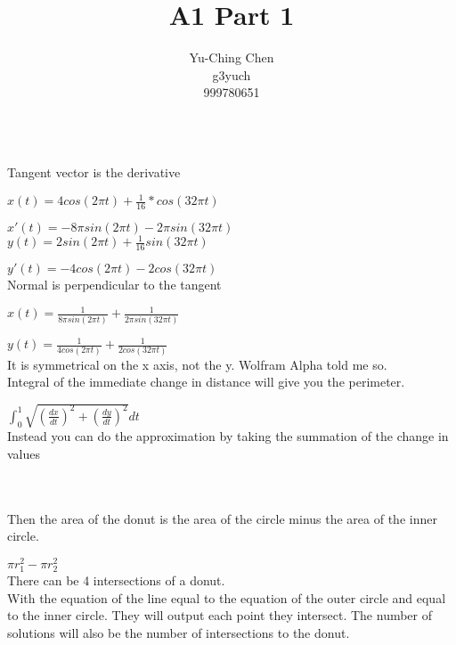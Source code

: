 \documentclass[12pt,a4paper]{article}
\author{Yu-Ching Chen\\g3yuch\\999780651}
\title{A1 Part 1}
\begin{document}
\maketitle
\section{}
${}$

Tangent vector is the derivative

$x(t) = 4cos(2\pi t) +\frac{1}{16} * cos (32 \pi t)$

$x'(t) = - 8 \pi sin(2 \pi t) - 2 \pi sin(32 \pi t)$
\\

$y(t) = 2 sin(2 \pi t) + \frac{1}{16} sin(32 \pi t)$

$y'(t) = -4cos(2 \pi t) - 2 cos(32 \pi t)$
\\

Normal is perpendicular to the tangent

$x(t) = \frac{1}{8 \pi sin(2 \pi t)} + \frac{1}{2 \pi sin(32 \pi t)}$

$y(t) = \frac{1}{4 cos(2 \pi t) } + \frac{1}{2cos(32 \pi t)}$
\\

It is symmetrical on the x axis, not the y. Wolfram Alpha told me so.
\\

Integral of the immediate change in distance will give you the perimeter.

$\int_0^1 \sqrt{(\frac{dx}{dt})^2 + (\frac{dy}{dt})^2}dt$
\\

Instead you can do the approximation by taking the summation of the change in values
\\

\section{}
${}$

Then the area of the donut is the area of the circle minus the area of the inner circle.

$\pi r_1^2 - \pi r_2^2$
\\

There can be 4 intersections of a donut.
\\

With the equation of the line equal to the equation of the outer circle and equal to the inner circle. They will output each point they intersect. The number of solutions will also be the number of intersections to the donut.
\\
\end{document}

